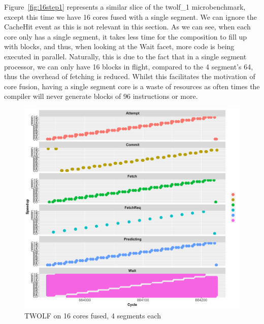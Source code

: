 Figure~\ref{fig:16step1} represents a similar slice of the twolf\_1 microbenchmark, except this time we have 16 cores fused with a single segment.
We can ignore the CacheHit event as this is not relevant in this section.
As we can see, when each core only has a single segment, it takes less time for the composition to fill up with blocks, and thus, when looking at the Wait facet, more code is being executed in parallel.
Naturally, this is due to the fact that in a single segment processor, we can only have 16 blocks in flight, compared to the 4 segment's 64, thus the overhead of fetching is reduced.
Whilst this facilitates the motivation of core fusion, having a single segment core is a waste of resources as often times the compiler will never generate blocks of 96 instructions or more.

\begin{figure}
\center
  \includegraphics[width=1\textwidth]{chapter3/graphics/twolf_16.pdf}
  \caption{TWOLF on 16 cores fused, 4 segments each}\label{fig:16step}
\end{figure}

